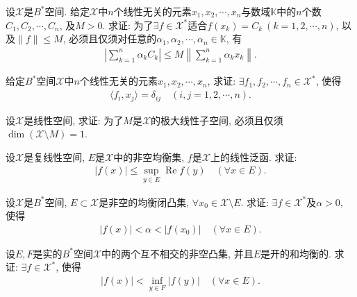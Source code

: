 \documentclass[../../main.tex]{subfiles}%
\begin{document}
\begin{example}
设$\mathscr{X}$是$B^*$空间. 给定$\mathscr{X}$中$n$个线性无关的元素$x_1, x_2, \cdots, x_n$与数域$\mathbb{K}$中的$n$个数$C_1, C_2, \cdots, C_n$, 及$M > 0$. 求证: 为了$\exists f \in \mathscr{X}^*$适合$f(x_k) = C_k \ (k=1,2,\cdots,n)$, 以及$\|f\| \leqslant M$, 必须且仅须对任意的$\alpha_1, \alpha_2, \cdots, \alpha_n \in \mathbb{K}$, 有
\begin{align*}
\left| \sum\limits_{k=1}^n \alpha_k C_k \right| \leqslant M \left\| \sum\limits_{k=1}^n \alpha_k x_k \right\|.
\end{align*}
\end{example}

\begin{example}
给定$B^*$空间$\mathscr{X}$中$n$个线性无关的元素$x_1, x_2, \cdots, x_n$, 求证: $\exists f_1, f_2, \cdots, f_n \in \mathscr{X}^*$, 使得
\begin{align*}
\langle f_i, x_j \rangle = \delta_{ij} \quad (i,j=1,2,\cdots,n).
\end{align*}
\end{example}

\begin{example}
设$\mathscr{X}$是线性空间, 求证: 为了$M$是$\mathscr{X}$的极大线性子空间, 必须且仅须$\dim(\mathscr{X} \setminus M) = 1$.
\end{example}

\begin{example}
设$\mathscr{X}$是复线性空间, $E$是$\mathscr{X}$中的非空均衡集, $f$是$\mathscr{X}$上的线性泛函. 求证:
\begin{align*}
|f(x)| \leqslant \sup\limits_{y \in E} \operatorname{Re} f(y) \quad (\forall x \in E).
\end{align*}
\end{example}

\begin{example}
设$\mathscr{X}$是$B^*$空间, $E \subset \mathscr{X}$是非空的均衡闭凸集, $\forall x_0 \in \mathscr{X} \setminus E$. 求证: $\exists f \in \mathscr{X}^*$及$\alpha > 0$, 使得
\begin{align*}
|f(x)| < \alpha < |f(x_0)| \quad (\forall x \in E).
\end{align*}
\end{example}

\begin{example}
设$E,F$是实的$B^*$空间$\mathscr{X}$中的两个互不相交的非空凸集, 并且$E$是开的和均衡的. 求证: $\exists f \in \mathscr{X}^*$, 使得
\begin{align*}
|f(x)| < \inf\limits_{y \in F} |f(y)| \quad (\forall x \in E).
\end{align*}
\end{example}
\end{document}
